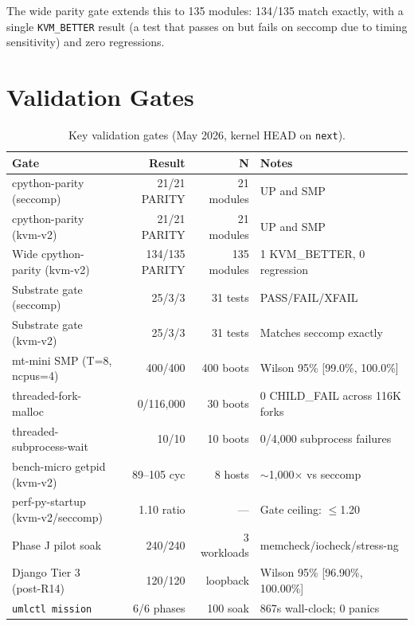 The wide parity gate extends this to 135 modules: 134/135 match
exactly, with a single \texttt{KVM\_BETTER} result (a test that
passes on \KVMvTwo{} but fails on seccomp due to timing sensitivity)
and zero regressions.


\section{Validation Gates}
\label{sec:bench-gates}

\begin{table}[htbp]
\centering
\caption{Key validation gates (May 2026, kernel HEAD on \texttt{next}).}
\label{tab:validation-gates}
\begin{tabular}{@{}lrrl@{}}
\toprule
Gate & Result & N & Notes \\
\midrule
cpython-parity (seccomp)          & 21/21 PARITY   & 21 modules  & UP and SMP \\
cpython-parity (kvm-v2)           & 21/21 PARITY   & 21 modules  & UP and SMP \\
Wide cpython-parity (kvm-v2)      & 134/135 PARITY & 135 modules & 1 KVM\_BETTER, 0 regression \\
Substrate gate (seccomp)          & 25/3/3         & 31 tests    & PASS/FAIL/XFAIL \\
Substrate gate (kvm-v2)           & 25/3/3         & 31 tests    & Matches seccomp exactly \\
mt-mini SMP (T=8, ncpus=4)        & 400/400        & 400 boots   & Wilson 95\% [99.0\%, 100.0\%] \\
threaded-fork-malloc               & 0/116,000      & 30 boots    & 0 CHILD\_FAIL across 116K forks \\
threaded-subprocess-wait           & 10/10          & 10 boots    & 0/4,000 subprocess failures \\
bench-micro getpid (kvm-v2)       & 89--105 cyc    & 8 hosts     & $\sim$1,000$\times$ vs seccomp \\
perf-py-startup (kvm-v2/seccomp)  & 1.10 ratio     & ---         & Gate ceiling: $\leq$1.20 \\
Phase J pilot soak                 & 240/240        & 3 workloads & memcheck/iocheck/stress-ng \\
Django Tier 3 (post-R14)           & 120/120        & loopback    & Wilson 95\% [96.90\%, 100.00\%] \\
\texttt{umlctl mission}           & 6/6 phases     & 100 soak    & 867s wall-clock; 0 panics \\
\bottomrule
\end{tabular}
\end{table}


